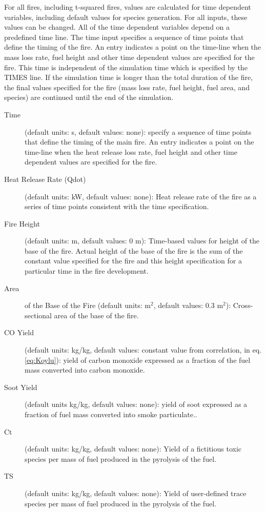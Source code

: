 For all fires, including t-squared fires, values are calculated for time dependent variables, including default values for species generation. For all inputs, these values can be changed. All of the time dependent variables depend on a predefined time line. The time input specifies a sequence of time points that define the timing of the fire.  An entry indicates a point on the time-line when the mass loss rate, fuel height and other time dependent values are specified for the fire.  This time is independent of the simulation time which is specified by the TIMES line. If the simulation time is longer than the total duration of the fire, the final values specified for the fire (mass loss rate, fuel height, fuel area, and species) are continued until the end of the simulation.

\begin{description}
\item[Time] (default units: s, default values: none): specify a sequence of time points that define the timing of the main fire.  An entry indicates a point on the time-line when the heat release loss rate, fuel height and other time dependent values are specified for the fire.

\item[Heat Release Rate (Qdot)] (default units: kW, default values: none): Heat release rate of the fire as a series of time points consistent with the time specification.

\item[Fire Height] (default units: m, default values: 0 m): Time-based values for height of the base of the fire.  Actual height of the base of the fire is the sum of the constant value specified for the fire and this height specification for a particular time in the fire development.

\item[Area] of the Base of the Fire (default units: m$^2$, default values: 0.3 m$^2$): Cross-sectional area of the base of the fire.

\item[CO Yield] (default units: kg/kg, default values: constant value from correlation, in eq. \ref{eq:Koylu}): yield of carbon monoxide expressed as a fraction of the fuel mass converted into carbon monoxide.

\item[Soot Yield] (default units kg/kg, default values: none): yield of soot expressed as a fraction of fuel mass converted into smoke particulate..

\item[Ct] (default units: kg/kg, default values: none): Yield of a fictitious toxic species per mass of fuel produced in the pyrolysis of the fuel.

\item[TS] (default units: kg/kg, default values: none): Yield of user-defined trace species per mass of fuel produced in the pyrolysis of the fuel.
\end{description}

